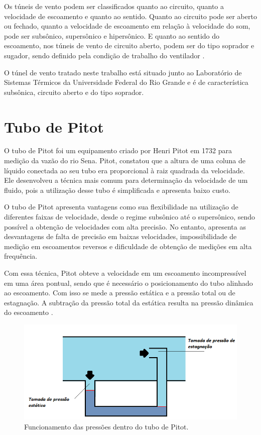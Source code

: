 Os túneis de vento podem ser classificados quanto ao circuito, quanto a velocidade de escoamento e quanto ao sentido. 
Quanto ao circuito pode ser aberto ou fechado, quanto a velocidade de escoamento em relação à velocidade do som, 
pode ser subsônico, supersônico e hipersônico. E quanto ao sentido do escoamento, nos túneis de vento de circuito aberto, podem 
ser do tipo soprador e sugador, sendo definido pela condição de trabalho do ventilador \cite{pritchard2005fox}.

O túnel de vento tratado neste trabalho está situado junto ao Laboratório de Sistemas Térmicos da Universidade Federal 
do Rio Grande e é de característica subsônica, circuito aberto e do tipo soprador.

\section{Tubo de Pitot}\label{sec:tubo}

O tubo de Pitot foi um equipamento criado por Henri Pitot em 1732 para medição da vazão do rio Sena. 
Pitot, constatou que a altura de uma coluna de líquido conectada ao seu tubo era 
proporcional à raiz quadrada da velocidade. Ele desenvolveu a técnica mais comum para determinação 
da velocidade de um fluido, pois a utilização desse tubo é simplificada e apresenta baixo custo.

O tubo de Pitot apresenta vantagens como sua flexibilidade na utilização de diferentes faixas de velocidade, 
desde o regime subsônico até o supersônico, sendo possível a obtenção de velocidades com alta precisão. 
No entanto, apresenta as desvantagens de falta de precisão em baixas velocidades, impossibilidade de medição 
em escoamentos reversos e dificuldade de obtenção de medições em alta frequência.

Com essa técnica, Pitot obteve a velocidade em um escoamento incompressível em uma área pontual, sendo que 
é necessário o posicionamento do tubo alinhado ao escoamento. Com isso se mede a pressão 
estática e a pressão total ou de estagnação. A subtração da pressão total da estática resulta na pressão 
dinâmica do escoamento \cite{pritchard2005fox}.

\begin{figure}[H]
\centering
\caption{Funcionamento das pressões dentro do tubo de Pitot.}\label{fig:pestagnacao}
\includegraphics[scale = 0.7]{figuras/pestagnacao}
\end{figure}

